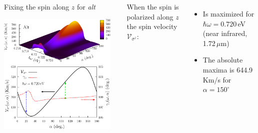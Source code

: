 \documentclass{beamer}
\begin{document}
\begin{frame}

\begin{columns}


\begin{center}

Fixing the spin along $z$ for \emph{alt}

\vspace{2mm}

\includegraphics[width=0.95\textwidth]{figs/fig6.pdf}

\end{center}  



{ When the spin is polarized along $z$ the spin velocity
$\mathcal{V}_{\sigma^{z}}$:}


\vspace{-2mm}

{\small

\begin{itemize}

\item 
Is maximized for $\hbar \omega = 0.720$\,eV (near infrared, 1.72\,$\mu$m)

\vspace{-1mm}
\item 
The absolute maxima is 644.9\,Km/s for $\alpha = 150^{\circ}$


\end{itemize}}
\end{columns}
\end{frame}
\end{document}
